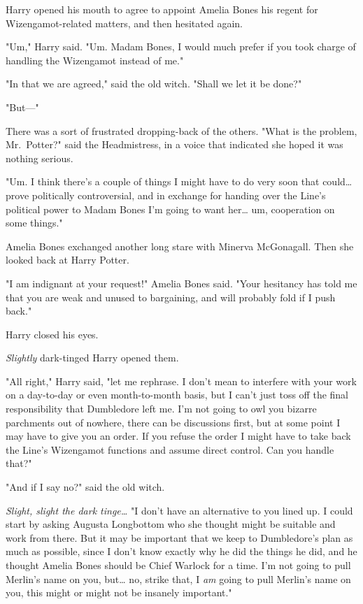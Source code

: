 Harry opened his mouth to agree to appoint Amelia Bones his regent for
Wizengamot-related matters, and then hesitated again.

"Um," Harry said. "Um. Madam Bones, I would much prefer if you took charge of
handling the Wizengamot instead of me."

"In that we are agreed," said the old witch. "Shall we let it be done?"

"But---"

There was a sort of frustrated dropping-back of the others. "What is the
problem, Mr.~Potter?" said the Headmistress, in a voice that indicated she
hoped it was nothing serious.

"Um. I think there's a couple of things I might have to do very soon that
could{\ldots} prove politically controversial, and in exchange for handing over
the Line's political power to Madam Bones I'm going to want her{\ldots} um,
cooperation on some things."

Amelia Bones exchanged another long stare with Minerva McGonagall. Then she
looked back at Harry Potter.

"I am indignant at your request!" Amelia Bones said. "Your hesitancy has told
me that you are weak and unused to bargaining, and will probably fold if I push
back."

Harry closed his eyes.

\emph{Slightly} dark-tinged Harry opened them.

"All right," Harry said, "let me rephrase. I don't mean to interfere with your
work on a day-to-day or even month-to-month basis, but I can't just toss off
the final responsibility that Dumbledore left me. I'm not going to owl you
bizarre parchments out of nowhere, there can be discussions first, but at some
point I may have to give you an order. If you refuse the order I might have to
take back the Line's Wizengamot functions and assume direct control. Can you
handle that?"

"And if I say no?" said the old witch.

\emph{Slight, slight the dark tinge{\ldots}} "I don't have an alternative to
you lined up. I could start by asking Augusta Longbottom who she thought might
be suitable and work from there. But it may be important that we keep to
Dumbledore's plan as much as possible, since I don't know exactly why he did
the things he did, and he thought Amelia Bones should be Chief Warlock for a
time. I'm not going to pull Merlin's name on you, but{\ldots} no, strike that,
I \emph{am} going to pull Merlin's name on you, this might or might not be
insanely important."

